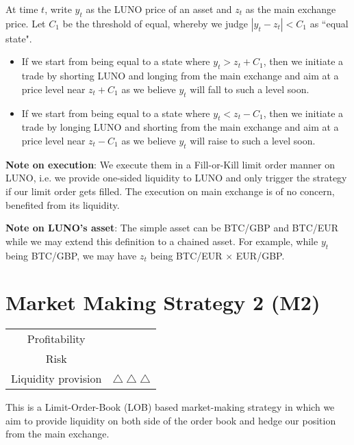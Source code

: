 \documentclass[12pt,a4paper]{article}
\begin{document}
At time $t$, write $y_t$ as the LUNO price of an asset and $z_t$ as the main exchange price.
	Let $C_1$ be the threshold of equal, whereby we judge $|y_t-z_t|<C_1$ as ``equal state".
\begin{itemize}
	\item 	If we start from being equal to a state where $y_t>z_t+C_1$, then we initiate a trade by shorting LUNO and longing from the main exchange and aim at a price level near $z_t+C_1$ as we believe $y_t$ will fall to such a level soon.
	\item If we start from being equal to a state where  $y_t< z_t -C_1$, then we initiate a trade by longing LUNO and shorting from the main exchange and aim at a price level near $z_t-C_1$ as we believe $y_t$ will raise to such a level soon.
\end{itemize}

\textbf{Note on execution}: We execute them in a Fill-or-Kill limit order manner on LUNO, i.e. we provide one-sided liquidity to LUNO and only trigger the strategy if our limit order gets filled. The execution on main exchange is of no concern, benefited from its liquidity.
	
\textbf{Note on LUNO's asset}: The simple asset can be BTC/GBP and BTC/EUR while we may extend this definition to a chained asset. For example, while $y_t$ being BTC/GBP, we may have $z_t$ being BTC/EUR $\times$ EUR/GBP.

\pagebreak
\section{Market Making Strategy 2 (M2)}

		\begin{table}[h]
	\centering
	\begin{tabular}{c|c}
		
		Profitability& \textdollaroldstyle \\
		
		Risk & \Radioactivity  \\
		
		Liquidity provision &$ \bigtriangleup \bigtriangleup  \bigtriangleup$\\
		
	\end{tabular}
\end{table}

This is a Limit-Order-Book (LOB) based market-making strategy in which we aim to provide liquidity on both side of the order book and hedge our position from the main exchange.
\end{document}
